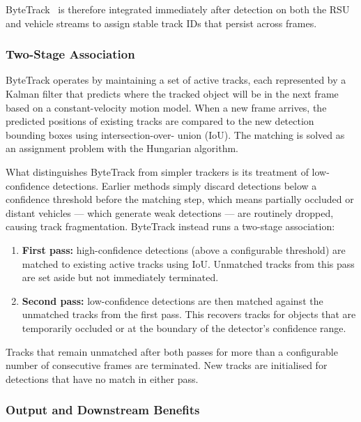 \documentclass[12pt]{article}
\begin{document}
\medskip
ByteTrack~\cite{zhang2022bytetrack} is therefore integrated immediately
after detection on both the RSU and vehicle streams to assign stable
track IDs that persist across frames.
 
\subsubsection*{Two-Stage Association}
 
ByteTrack operates by maintaining a set of active tracks, each
represented by a Kalman filter that predicts where the tracked object
will be in the next frame based on a constant-velocity motion model.
When a new frame arrives, the predicted positions of existing tracks are
compared to the new detection bounding boxes using intersection-over-
union (IoU). The matching is solved as an assignment problem with the
Hungarian algorithm.
 
\medskip
What distinguishes ByteTrack from simpler trackers is its treatment of
low-confidence detections. Earlier methods simply discard detections
below a confidence threshold before the matching step, which means
partially occluded or distant vehicles --- which generate weak
detections --- are routinely dropped, causing track fragmentation.
ByteTrack instead runs a two-stage association:
 
\begin{enumerate}
    \item \textbf{First pass:} high-confidence detections (above a
    configurable threshold) are matched to existing active tracks using
    IoU. Unmatched tracks from this pass are set aside but not
    immediately terminated.
    \item \textbf{Second pass:} low-confidence detections are then
    matched against the unmatched tracks from the first pass. This
    recovers tracks for objects that are temporarily occluded or at the
    boundary of the detector's confidence range.
\end{enumerate}
 
\noindent Tracks that remain unmatched after both passes for more than a
configurable number of consecutive frames are terminated. New tracks are
initialised for detections that have no match in either pass.
 
\subsubsection*{Output and Downstream Benefits}
 
\end{document}
